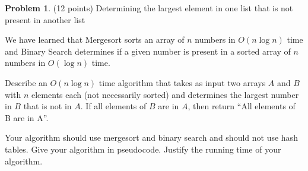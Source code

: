 \documentclass[11pt]{article}
\theoremstyle{definition}
\theoremstyle{theorem}
\newtheorem{prob}{Problem}
\newcommand{\solution}[1]{\medskip\noindent{\color{DarkBlue}\textbf{Solution:}} #1}
\newcommand{\solution}[1]{}
\begin{document}
\newpage
\begin{prob}
  \label{prob:sort_binary_search}
  (12 points) Determining the largest element in one list that is not
  present in another list
\end{prob}

We have learned that Mergesort sorts an array of $n$ numbers in $O(n
\log n)$ time and Binary Search determines if a given number is
present in a sorted array of $n$ numbers in $O(\log n)$ time.

Describe an $O(n \log n)$ time algorithm that takes as input two
arrays $A$ and $B$ with $n$ elements each (not necessarily sorted) and
determines the largest number in $B$ that is not in $A$.  If all
elements of $B$ are in $A$, then return ``All elements of B are in A''.

Your algorithm should use mergesort and binary search and should not
use hash tables.  Give your algorithm in pseudocode.  Justify the
running time of your algorithm.

\solution{
}
\end{document}
